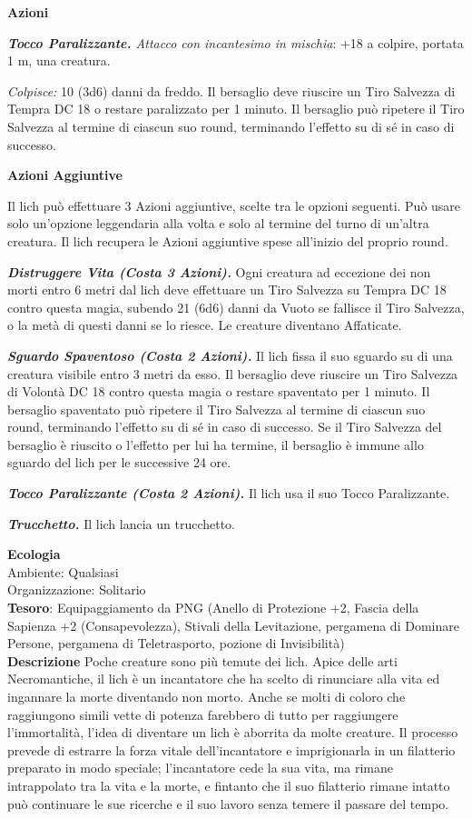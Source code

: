 \begin{multicols}{2}
\textbf{Azioni}

\textit{\textbf{Tocco Paralizzante.} Attacco con incantesimo in mischia}: +18 a colpire, portata 1 m, una creatura.

\textit{Colpisce:} 10 (3d6) danni da freddo. Il bersaglio deve riuscire un Tiro Salvezza di Tempra DC 18 o restare paralizzato per 1 minuto. Il bersaglio può ripetere il Tiro Salvezza al termine di ciascun suo round, terminando l'effetto su di sé in caso di successo.

\textbf{Azioni Aggiuntive}

Il lich può effettuare 3 Azioni aggiuntive, scelte tra le opzioni seguenti. Può usare solo un'opzione leggendaria alla volta e solo al termine del turno di un'altra creatura. Il lich recupera le Azioni aggiuntive spese all'inizio del proprio round.

\textit{\textbf{Distruggere Vita (Costa 3 Azioni).}} Ogni creatura ad eccezione dei non morti entro 6 metri dal lich deve effettuare un Tiro Salvezza su Tempra DC 18 contro questa magia, subendo 21 (6d6) danni da Vuoto se fallisce il Tiro Salvezza, o la metà di questi danni se lo riesce. Le creature diventano Affaticate.

\textit{\textbf{Sguardo Spaventoso (Costa 2 Azioni).}} Il lich fissa il suo sguardo su di una creatura visibile entro 3 metri da esso. Il bersaglio deve riuscire un Tiro Salvezza di Volontà DC 18 contro questa magia o restare spaventato per 1 minuto. Il bersaglio spaventato può ripetere il Tiro Salvezza al termine di ciascun suo round, terminando l'effetto su di sé in caso di successo. Se il Tiro Salvezza del bersaglio è riuscito o l'effetto per lui ha termine, il bersaglio è immune allo sguardo del lich per le successive 24 ore.

\textit{\textbf{Tocco Paralizzante (Costa 2 Azioni).}} Il lich usa il suo Tocco Paralizzante.

\textit{\textbf{Trucchetto.}} Il lich lancia un trucchetto.

\textbf{Ecologia}\\
Ambiente: Qualsiasi\\
Organizzazione: Solitario\\
\textbf{Tesoro}: Equipaggiamento da PNG (Anello di Protezione +2, Fascia della Sapienza +2 (Consapevolezza), Stivali della Levitazione, pergamena di Dominare Persone, pergamena di Teletrasporto, pozione di Invisibilità)\\

\textbf{Descrizione}
Poche creature sono più temute dei lich. Apice delle arti Necromantiche, il lich è un incantatore che ha scelto di rinunciare alla vita ed ingannare la morte diventando non morto. Anche se molti di coloro che raggiungono simili vette di potenza farebbero di tutto per raggiungere l'immortalità, l'idea di diventare un lich è aborrita da molte creature. Il processo prevede di estrarre la forza vitale dell'incantatore e imprigionarla in un filatterio preparato in modo speciale; l'incantatore cede la sua vita, ma rimane intrappolato tra la vita e la morte, e fintanto che il suo filatterio rimane intatto può continuare le sue ricerche e il suo lavoro senza temere il passare del tempo.




\end{multicols}
